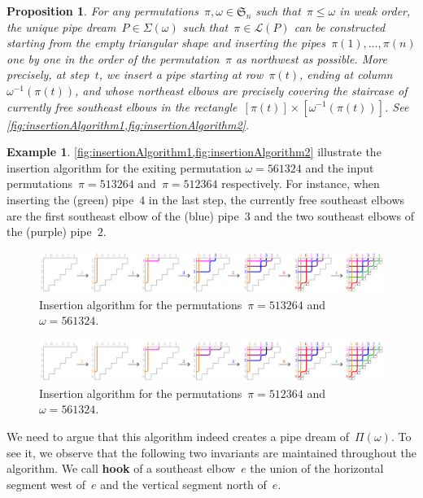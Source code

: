 \documentclass[reqno]{amsart}
\newtheorem{proposition}[theorem]{Proposition}
\theoremstyle{definition}
\newtheorem{example}[theorem]{Example}
\newcommand{\defn}[1]{\textbf{\textsf{\color{PineGreen} #1}}} %
\newcommand{\fS}{\mathfrak{S}} %
\newcommand{\pipeDreams}{\Pi} %
\newcommand{\acyclicPipeDreams}{\Sigma} %
\newcommand{\linearExtensions}{\mathcal{L}} %
\begin{document}
\begin{proposition}
\label{prop:insertionAlgorithm}
For any permutations~$\pi,\omega \in \fS_n$ such that~$\pi \le \omega$ in weak order, the unique pipe dream~$P \in \acyclicPipeDreams(\omega)$ such that~$\pi \in \linearExtensions(P)$ can be constructed starting from the empty triangular shape and inserting the pipes~$\pi(1), \dots, \pi(n)$ one by one in the order of the permutation~$\pi$ as northwest as possible.
More precisely, at step~$t$, we insert a pipe starting at row~$\pi(t)$, ending at column~$\omega^{-1}(\pi(t))$, and whose northeast elbows are precisely covering the staircase of currently free southeast elbows in the rectangle~$[\pi(t)] \times [\omega^{-1}(\pi(t))]$.
See \cref{fig:insertionAlgorithm1,fig:insertionAlgorithm2}.
\end{proposition}

\begin{example}
\label{exm:insertionAlgorithm}
\cref{fig:insertionAlgorithm1,fig:insertionAlgorithm2} illustrate the insertion algorithm for the exiting permutation ${\omega = 561324}$ and the input permutations~${\pi = 513264}$ and~${\pi = 512364}$ respectively.
For instance, when inserting the (green) pipe~$4$ in the last step, the currently free southeast elbows are the first southeast elbow of the (blue) pipe~$3$ and the two southeast elbows of the (purple) pipe~$2$.
%
\begin{figure}[t]
	\centerline{\includegraphics[scale=.9]{insertion1}}
	\caption{Insertion algorithm for the permutations~$\pi = 513264$ and~$\omega = 561324$.}
	\label{fig:insertionAlgorithm1}
\end{figure}
%
\begin{figure}[t]
	\centerline{\includegraphics[scale=.9]{insertion2}}
	\caption{Insertion algorithm for the permutations~$\pi = 512364$ and~$\omega = 561324$.}
	\label{fig:insertionAlgorithm2}
\end{figure}
\end{example}

We need to argue that this algorithm indeed creates a pipe dream of~$\pipeDreams(\omega)$.
To see it, we observe that the following two invariants are maintained throughout the algorithm.
We call \defn{hook} of a southeast elbow~$e$ the union of the horizontal segment west of~$e$ and the vertical segment north of~$e$.
\end{document}
